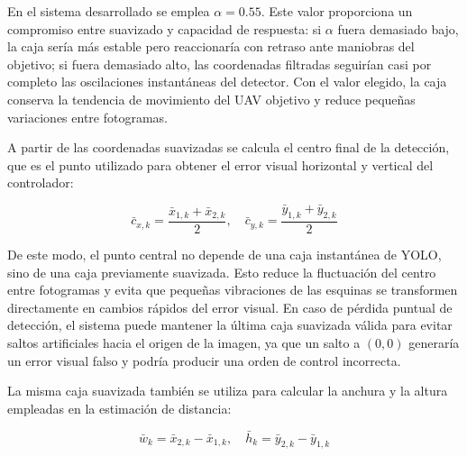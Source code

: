 En el sistema desarrollado se emplea $\alpha = 0.55$. Este valor proporciona un compromiso entre suavizado y capacidad de respuesta: si $\alpha$ fuera demasiado bajo, la caja sería más estable pero reaccionaría con retraso ante maniobras del objetivo; si fuera demasiado alto, las coordenadas filtradas seguirían casi por completo las oscilaciones instantáneas del detector. Con el valor elegido, la caja conserva la tendencia de movimiento del UAV objetivo y reduce pequeñas variaciones entre fotogramas.

\vspace{0.3cm}

A partir de las coordenadas suavizadas se calcula el centro final de la detección, que es el punto utilizado para obtener el error visual horizontal y vertical del controlador:

\vspace{0.3cm}

\begin{equation}
\bar{c}_{x,k} = \frac{\bar{x}_{1,k} + \bar{x}_{2,k}}{2}, \quad
\bar{c}_{y,k} = \frac{\bar{y}_{1,k} + \bar{y}_{2,k}}{2}
\end{equation}

\vspace{0.3cm}

De este modo, el punto central no depende de una caja instantánea de YOLO, sino de una caja previamente suavizada. Esto reduce la fluctuación del centro entre fotogramas y evita que pequeñas vibraciones de las esquinas se transformen directamente en cambios rápidos del error visual. En caso de pérdida puntual de detección, el sistema puede mantener la última caja suavizada válida para evitar saltos artificiales hacia el origen de la imagen, ya que un salto a $(0,0)$ generaría un error visual falso y podría producir una orden de control incorrecta.

\vspace{0.3cm}

La misma caja suavizada también se utiliza para calcular la anchura y la altura empleadas en la estimación de distancia:

\vspace{0.3cm}

\begin{equation}
\bar{w}_k = \bar{x}_{2,k} - \bar{x}_{1,k}, \quad
\bar{h}_k = \bar{y}_{2,k} - \bar{y}_{1,k}
\end{equation}

\vspace{0.3cm}

